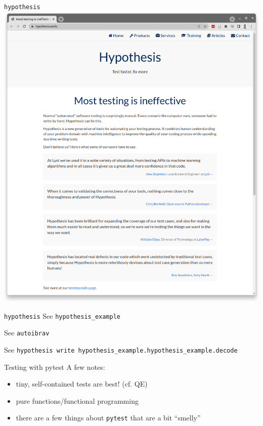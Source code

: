 \documentclass[xcolor=table,aspectratio=169]{beamer}
\numberwithin{equation}{section}
\begin{document}
\begin{frame}{\texttt{hypothesis}}
  \includegraphics[width=\textwidth]{figures/hypothesis.png}
\end{frame}


\begin{frame}{\texttt{hypothesis}}
  See \texttt{hypothesis\_example}

  See \texttt{autoibrav}

  See \texttt{hypothesis write hypothesis\_example.hypothesis\_example.decode}
\end{frame}

\begin{frame}{Testing with pytest}
  A few notes:

  \begin{itemize}
    \item tiny, self-contained tests are best! (cf. QE)
    \item pure functions/functional programming
    \item there are a few things about \texttt{pytest} that are a bit ``smelly''
  \end{itemize}


\end{frame}
\end{document}
